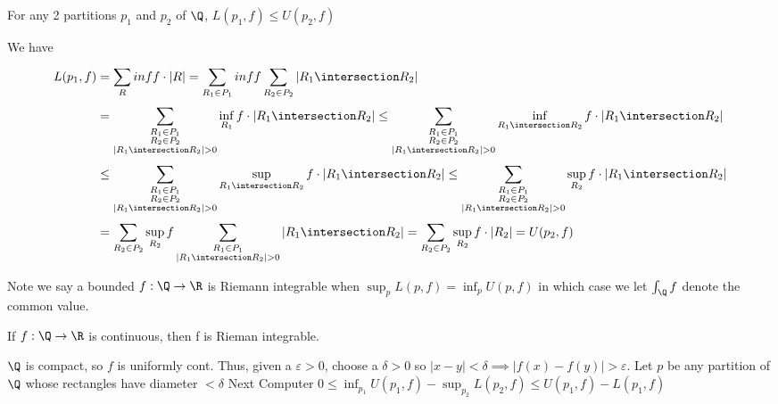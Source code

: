 \begin{lemma}
	For any 2 partitions $p_1$ and $p_2$ of  $\Q$,  $L(p_1,f) \leq U(p_2, f)$
\end{lemma}

\begin{solution}
	We have
	\begin{align*}
		L(p_1, f) &= \sum_{R}^{}  inf f \cdot |R| = \sum_{R_1 \in P_1}^{} inf f 
		\sum_{R_2 \in P_2}^{} |R_1 \intersection R_2 | \\
				  &= \sum_{\substack{R_1 \in P_1 \\ R_2 \in P_2 \\ |R_1 \intersection R_2 | > 0} }^{} \inf_{R_1} f \cdot |R_1 \intersection R_2 | 
				  \leq \sum_{\substack{R_1 \in P_1 \\ R_2 \in P_2 \\ |R_1 \intersection R_2 | > 0} }^{} \inf_{R_1 \intersection R_2} f \cdot |R_1 \intersection R_2 | \\
				  &\leq \sum_{\substack{R_1 \in P_1 \\ R_2 \in P_2 \\ |R_1 \intersection R_2 | > 0} }^{} \sup_{R_1 \intersection R_2} f \cdot |R_1 \intersection R_2 |
				  \leq \sum_{\substack{R_1 \in P_1 \\ R_2 \in P_2 \\ |R_1 \intersection R_2 | > 0} }^{} \sup_{R_2} f \cdot |R_1 \intersection R_2 | \\
				  &= \sum_{R_2 \in P_2}^{} \sup_{R_2} f \sum_{\substack{R_1 \in P_1 \\ |R_1 \intersection R_2 | > 0}}^{} |R_1 \intersection R_2 |  = \sum_{R_2 \in P_2}^{} \sup_{R_2} f \cdot |R_2| = U(p_2, f)
	\end{align*} 
\end{solution}


Note we say a bounded $f : \Q \to \R$ is Riemann integrable when  $\sup_p L(p,f) = \inf_p U(p,f)$ in which case we let  $\int_{\Q} f$ denote the common value.


\begin{theorem}
	If $f : \Q \to \R$	 is continuous, then f is Rieman integrable.
\end{theorem}

\begin{solution}
	$\Q$ is compact, so  $f$ is uniformly cont. Thus, given a $\varepsilon >0 $, choose a $\delta >0$ so  $|x-y| < \delta \implies |f(x) - f(y)| > \varepsilon$. Let $p$ be any partition of  $\Q$ whose rectangles have diameter  $< \delta$ \newline
	Next Computer  $0 \leq \inf_{p_1} U(p_1, f) - \sup_{p_2} L(p_2, f) \leq U(p_1, f) - L(p_1, f)$
\end{solution}


